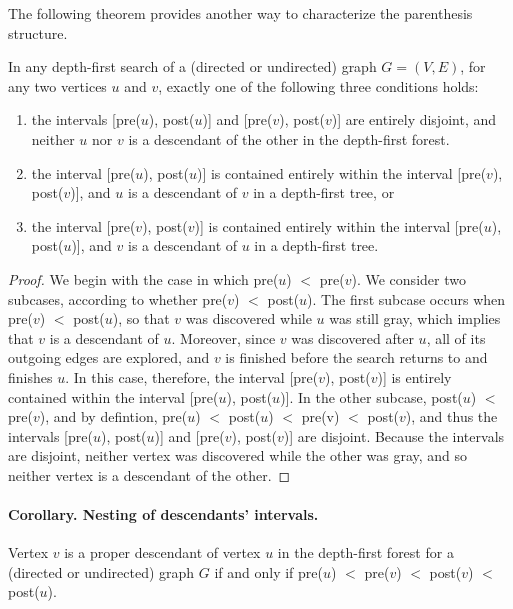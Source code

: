 The following theorem provides another way to characterize the parenthesis structure.

\begin{claim}
In any depth-first search of a (directed or undirected) graph $G = (V, E)$, for any two vertices $u$ and $v$, exactly one of the following three conditions holds:

\begin{enumerate}
  \item the intervals [pre($u$), post($u$)] and [pre($v$), post($v$)] are entirely disjoint, and neither $u$ nor $v$ is a descendant of the other in the depth-first forest.
  \item the interval [pre($u$), post($u$)] is contained entirely within the interval [pre($v$), post($v$)], and $u$ is a descendant of $v$ in a depth-first tree, or
  \item the interval [pre($v$), post($v$)] is contained entirely within the interval [pre($u$), post($u$)], and $v$ is a descendant of $u$ in a depth-first tree.
  \end{enumerate}
\end{claim}

\begin{proof} We begin with the case in which pre($u$) $<$ pre($v$). We consider two subcases, according to whether pre($v$) $<$ post($u$). The first subcase occurs when pre($v$) $<$ post($u$), so that $v$ was discovered while $u$ was still gray, which implies that $v$ is a descendant of $u$. Moreover, since $v$ was discovered after $u$, all of its outgoing edges are explored, and $v$ is finished before the search returns to and finishes $u$. In this case, therefore, the interval [pre($v$), post($v$)] is entirely contained within the interval [pre($u$), post($u$)]. In the other subcase, post($u$) $<$ pre($v$), and by defintion, pre($u$) $<$ post($u$) $<$ pre(v) $<$ post($v$), and thus the intervals [pre($u$), post($u$)] and [pre($v$), post($v$)] are disjoint. Because the intervals are disjoint, neither vertex was discovered while the other was gray, and so neither vertex is a descendant of the other.
\end{proof}


\paragraph{  Corollary. Nesting of descendants' intervals.}
  Vertex $v$ is a proper descendant of vertex $u$ in the depth-first forest for a (directed or undirected) graph $G$ if and only if pre($u$) $<$ pre($v$) $<$ post($v$) $<$ post($u$).


